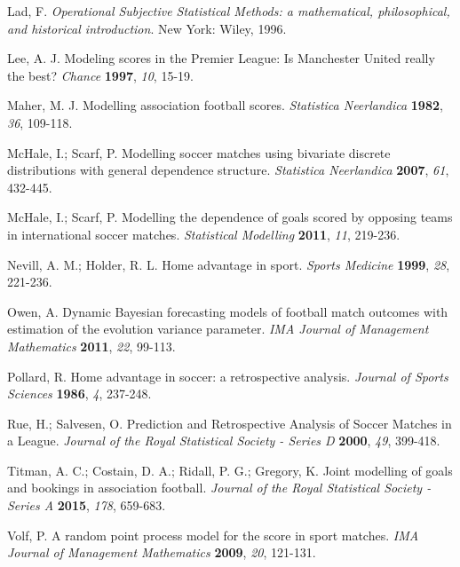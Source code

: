 \documentclass[journal,article,accept,moreauthors,pdftex,12pt,a4paper]{mdpi}
\begin{document}
{\begin{thebibliography}{999}
        Lad, F. {\it Operational Subjective Statistical Methods: a mathematical,
            philosophical, and historical introduction}. New York: Wiley, 1996.

        Lee, A. J. Modeling scores in the Premier League: Is Manchester United really the best? {\em Chance} {\bf 1997}, {\em 10}, 15-19.

        Maher, M. J. Modelling association football scores. {\em Statistica Neerlandica} {\bf 1982}, {\em 36}, 109-118.

        McHale, I.; Scarf, P. Modelling soccer matches using bivariate
        discrete distributions with general dependence structure. {\em
            Statistica Neerlandica} {\bf 2007}, {\em 61}, 432-445.

        McHale, I.; Scarf, P. Modelling the dependence of goals scored by
        opposing teams in international soccer matches. {\em Statistical
            Modelling} {\bf 2011}, {\em 11}, 219-236.

        Nevill, A. M.; Holder, R. L. Home advantage in sport. {\em Sports
            Medicine} {\bf 1999}, {\em 28}, 221-236.

        Owen, A. Dynamic Bayesian forecasting models of football match
        outcomes with estimation of the evolution variance parameter. {\em
            IMA Journal of Management Mathematics} {\bf 2011}, {\em 22}, 99-113.

        Pollard, R. Home advantage in soccer: a retrospective analysis. {\em Journal of Sports Sciences} {\bf 1986}, {\em 4}, 237-248.

        Rue, H.; Salvesen, O. Prediction and Retrospective Analysis of
        Soccer Matches in a League. {\em Journal of the Royal Statistical
            Society - Series D} {\bf 2000}, {\em 49}, 399-418.

        Titman, A. C.; Costain, D. A.; Ridall, P. G.; Gregory, K. Joint
        modelling of goals and bookings in association football. {\em
            Journal of the Royal Statistical Society - Series A} {\bf 2015},
        {\em 178}, 659-683.

        Volf, P. A random point process model for the score in sport
        matches. {\em IMA Journal of Management Mathematics} {\bf 2009},
        {\em 20}, 121-131.


\end{thebibliography}}
\end{document}
